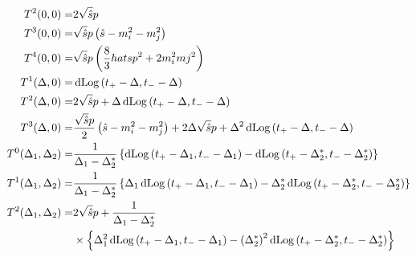 \documentclass[../main.tex]{subfiles}
\begin{document}
\begin{subequations}
	\begin{align}
		T^2(0, 0) =                         & 2\sqrt{\hat{s}}p                                                                                                                                                                                        \\
		T^3(0, 0) =                         & \sqrt{\hat{s}}p\left(\hat{s} - m_i^2 - m_j^2\right)                                                                                                                                                        \\
		T^4(0, 0) =                         & \sqrt{\hat{s}}p \left(\frac{8}{3}hat{s}p^2 + 2m_i^2mj^2\right)                                                                                                                                             \\
		T^1\!\left(\Delta, 0\right) =          & \operatorname{dLog}\left(t_+ - \Delta, t_- - \Delta\right)                                                                                                                                                 \\
		T^2\!\left(\Delta, 0\right) =          & 2\sqrt{\hat{s}}p + \Delta \operatorname{dLog}\left(t_+ - \Delta, t_- - \Delta\right)                                                                                                                       \\
		T^3\!\left(\Delta, 0\right) =          & \frac{\sqrt{\hat{s}}p}{2}\left(\hat{s} - m_i^2 - m_j^2\right) + 2\Delta\sqrt{\hat{s}}p  + \Delta^2 \operatorname{dLog}\left(t_+ - \Delta, t_- - \Delta\right)                                                 \\
		T^0\!\left(\Delta_1, \Delta_2\right) = & \frac{1}{\Delta_1 - \Delta_2^\ast} \left\{\operatorname{dLog}\left(t_+ - \Delta_1, t_- - \Delta_1\right) - \operatorname{dLog}\left(t_+ - \Delta_2^\ast, t_- - \Delta_2^\ast\right)\right\}                        \\
		T^1\!\left(\Delta_1, \Delta_2\right) = & \frac{1}{\Delta_1 - \Delta_2^\ast} \left\{\Delta_1 \operatorname{dLog}\left(t_+ - \Delta_1, t_- - \Delta_1\right) - \Delta_2^\ast \operatorname{dLog}\left(t_+ - \Delta_2^\ast, t_- - \Delta_2^\ast\right)\right\} \\
		\nonumber
		T^2\!\left(\Delta_1, \Delta_2\right) = & 2\sqrt{\hat{s}}p  + \frac{1}{\Delta_1 - \Delta_2^\ast}                                                                                                                                                  \\
		                                    & \times \left\{\Delta_1^2 \operatorname{dLog}\left(t_+ - \Delta_1, t_- - \Delta_1\right) - \left(\Delta_2^\ast\right)^2 \operatorname{dLog}\left(t_+ - \Delta_2^\ast, t_- - \Delta_2^\ast\right)\right\}
	\end{align}
\end{subequations}
\end{document}
